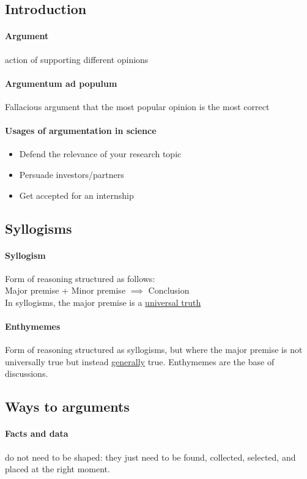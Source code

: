 \documentclass{article}
\begin{document}
\subsection{Introduction}
\paragraph{Argument} action of supporting different opinions
\paragraph{Argumentum ad populum} Fallacious argument that the most popular opinion is the most correct
\paragraph{Usages of argumentation in science}
\begin{itemize}
	\item Defend the relevance of your research topic
	\item Persuade investors/partners
	\item Get accepted for an internship
\end{itemize}
\subsection{Syllogisms}
\paragraph{Syllogism} Form of reasoning structured as follows:\\
Major premise + Minor premise $\implies$ Conclusion\\
In syllogisms, the major premise is a \underline{universal truth}
\paragraph{Enthymemes} Form of reasoning structured as syllogisms, but where the major premise is not universally true but instead \underline{generally} true. Enthymemes are the base of discussions.
\subsection{Ways to arguments} 
\paragraph{Facts and data} do not need to be shaped: they just need to be found, collected, selected, and placed at the right moment.
\end{document}
